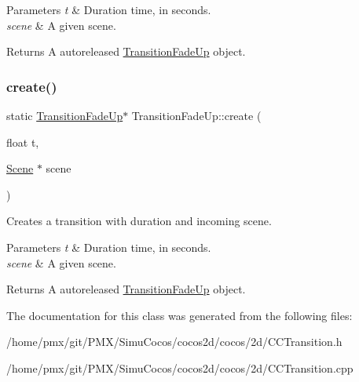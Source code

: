 \begin{DoxyParams}{Parameters}
{\em t} & Duration time, in seconds. \\
\hline
{\em scene} & A given scene. \\
\hline
\end{DoxyParams}
\begin{DoxyReturn}{Returns}
A autoreleased \hyperlink{classTransitionFadeUp}{Transition\+Fade\+Up} object. 
\end{DoxyReturn}
\mbox{\label{classTransitionFadeUp_a0a8ff113a716e182f74e3b170cdfe8c1}} 
\subsubsection{\texorpdfstring{create()}{create()}\hspace{0.1cm}{\footnotesize\ttfamily [2/2]}}
{\footnotesize\ttfamily static \hyperlink{classTransitionFadeUp}{Transition\+Fade\+Up}$\ast$ Transition\+Fade\+Up\+::create (\begin{DoxyParamCaption}\item[{float}]{t,  }\item[{\hyperlink{classScene}{Scene} $\ast$}]{scene }\end{DoxyParamCaption})\hspace{0.3cm}{\ttfamily [static]}}

Creates a transition with duration and incoming scene.


\begin{DoxyParams}{Parameters}
{\em t} & Duration time, in seconds. \\
\hline
{\em scene} & A given scene. \\
\hline
\end{DoxyParams}
\begin{DoxyReturn}{Returns}
A autoreleased \hyperlink{classTransitionFadeUp}{Transition\+Fade\+Up} object. 
\end{DoxyReturn}


The documentation for this class was generated from the following files\+:\begin{DoxyCompactItemize}
\item 
/home/pmx/git/\+P\+M\+X/\+Simu\+Cocos/cocos2d/cocos/2d/C\+C\+Transition.\+h\item 
/home/pmx/git/\+P\+M\+X/\+Simu\+Cocos/cocos2d/cocos/2d/C\+C\+Transition.\+cpp\end{DoxyCompactItemize}
